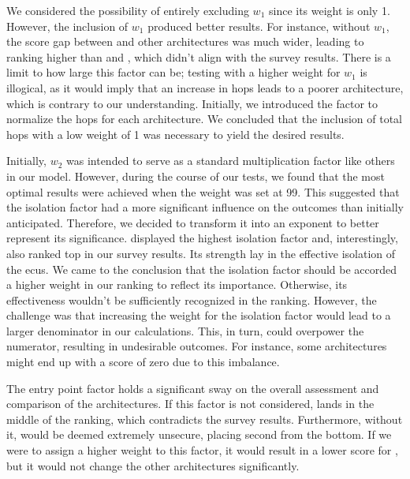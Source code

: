 We considered the possibility of entirely excluding $w_{1}$ since its weight is only 1. 
However, the inclusion of $w_{1}$ produced better results. For instance, without $w_{1}$, the score gap between  and other architectures was much wider, 
leading to  ranking higher than  and , which didn't align with the survey results. 
There is a limit to how large this factor can be; testing with a higher weight for $w_{1}$ is illogical, as it would imply that an increase in hops leads to a poorer architecture, 
which is contrary to our understanding. Initially, we introduced the factor to normalize the hops for each architecture. 
We concluded that the inclusion of total hops with a low weight of 1 was necessary to yield the desired results.

Initially, $w_{2}$ was intended to serve as a standard multiplication factor like others in our model. 
However, during the course of our tests, we found that the most optimal results were achieved when the weight was set at 99. 
This suggested that the isolation factor had a more significant influence on the outcomes than initially anticipated. 
Therefore, we decided to transform it into an exponent to better represent its significance.
 displayed the highest isolation factor and, interestingly, also ranked top in our survey results. 
Its strength lay in the effective isolation of the \acrshort{ecu}s. 
We came to the conclusion that the isolation factor should be accorded a higher weight in our ranking to reflect its importance. 
Otherwise, its effectiveness wouldn't be sufficiently recognized in the ranking.
However, the challenge was that increasing the weight for the isolation factor would lead to a larger denominator in our calculations. 
This, in turn, could overpower the numerator, resulting in undesirable outcomes. 
For instance, some architectures might end up with a score of zero due to this imbalance.

The entry point factor holds a significant sway on the overall assessment and comparison of the architectures. 
If this factor is not considered,  lands in the middle of the ranking, 
which contradicts the survey results. Furthermore, without it, 
would be deemed extremely unsecure, placing second from the bottom. 
If we were to assign a higher weight to this factor, it would result in a lower score for , 
but it would not change the other architectures significantly.


